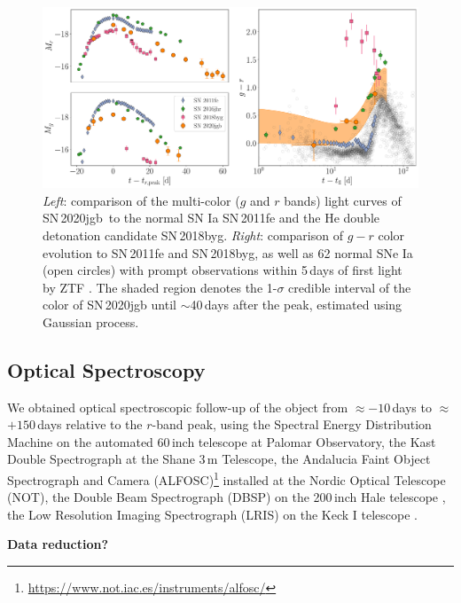 \documentclass[twocolumn]{aastex631}
\newcommand\sn{SN\,2020jgb}
\begin{document}
\begin{figure}
    \centering
    \includegraphics[width=\textwidth]{photometry.pdf}
    \caption{\textit{Left}: comparison of the multi-color ($g$ and $r$ bands) light curves of \sn\ to the normal SN Ia SN\,2011fe and the He double detonation candidate SN\,2018byg. \textit{Right}: comparison of $g-r$ color evolution to SN\,2011fe and SN\,2018byg, as well as 62 normal SNe Ia (open circles) with prompt observations within 5\,days of first light by ZTF \citep{Bulla2020}. The shaded region denotes the 1-$\sigma$ credible interval of the color of SN\,2020jgb until $\sim$40\,days after the peak, estimated using Gaussian process.}
    \label{fig:photometry}
\end{figure}

\subsection{Optical Spectroscopy}
We obtained optical spectroscopic follow-up of the object from $\approx$$-10$\,days to $\approx$$+150$\,days relative to the $r$-band peak, using the Spectral Energy Distribution Machine \citep[SEDM;][]{SEDM_2018} on the automated 60\,inch telescope \citep[P60;][]{P60_2006} at Palomar Observatory, the Kast Double Spectrograph \citep{miller1994kast} at the Shane 3\,m Telescope, the Andalucia Faint Object Spectrograph and Camera (ALFOSC)\footnote{\url{https://www.not.iac.es/instruments/alfosc/}} installed at the Nordic Optical Telescope (NOT), the Double Beam Spectrograph (DBSP) on the 200\,inch Hale telescope \citep[P200;][]{P200_1982}, the Low Resolution Imaging Spectrograph (LRIS) on the Keck I telescope \citep{Keck_1995}.

\textbf{Data reduction?}
\end{document}
